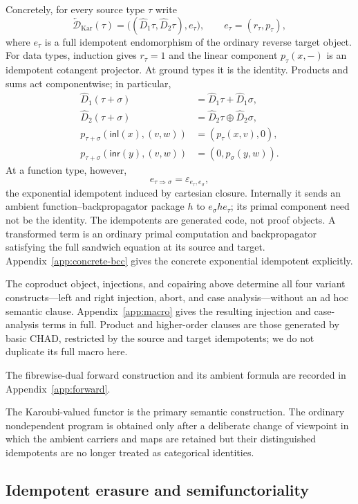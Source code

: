 \documentclass[runningheads,envcountsame]{llncs}
\newcommand{\DKar}{\overleftarrow{\mathcal D}_{\mathrm{Kar}}}
\begin{document}
Concretely, for every source type $\tau$ write
$$
\DKar(\tau)
=
\bigl((\widehat D_1\tau,\widehat D_2\tau),e_\tau\bigr),
\qquad
e_\tau=(r_\tau,p_\tau),
$$
where $e_\tau$ is a full idempotent endomorphism of the ordinary reverse target object. For data types, induction gives $r_\tau=1$ and the linear component $p_\tau(x,-)$ is an idempotent cotangent projector. At ground types it is the identity. Products and sums act componentwise; in particular,
$$
\begin{aligned}
\widehat D_1(\tau+\sigma)
&=\widehat D_1\tau+\widehat D_1\sigma,\\
\widehat D_2(\tau+\sigma)
&=\widehat D_2\tau\oplus\widehat D_2\sigma,\\
p_{\tau+\sigma}(\mathsf{inl}(x),(v,w))
&=(p_\tau(x,v),0),\\
p_{\tau+\sigma}(\mathsf{inr}(y),(v,w))
&=(0,p_\sigma(y,w)).
\end{aligned}
$$
At a function type, however,
$$
e_{\tau\Rightarrow\sigma}
=
\varepsilon_{e_\tau,e_\sigma},
$$
the exponential idempotent induced by cartesian closure. Internally it sends an ambient function--backpropagator package $h$ to $e_\sigma h e_\tau$; its primal component need not be the identity. The idempotents are generated code, not proof objects. A transformed term is an ordinary primal computation and backpropagator satisfying the full sandwich equation at its source and target. Appendix~\ref{app:concrete-bcc} gives the concrete exponential idempotent explicitly.

The coproduct object, injections, and copairing above determine all four variant constructs---left and right injection, abort, and case analysis---without an ad hoc semantic clause. Appendix~\ref{app:macro} gives the resulting injection and case-analysis terms in full. Product and higher-order clauses are those generated by basic CHAD, restricted by the source and target idempotents; we do not duplicate its full macro here.

The fibrewise-dual forward construction and its ambient formula are recorded in Appendix~\ref{app:forward}.

The Karoubi-valued functor is the primary semantic construction. The ordinary nondependent program is obtained only after a deliberate change of viewpoint in which the ambient carriers and maps are retained but their distinguished idempotents are no longer treated as categorical identities.

\subsection{Idempotent erasure and semifunctoriality}
\end{document}
